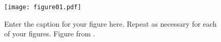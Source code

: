 \documentclass{ametsocV5}
\begin{document}
%

%
\begin{figure}[t]
 \noindent\texttt{[image: figure01.pdf]}\\
 \caption{Enter the caption for your figure here.  Repeat as
 necessary for each of your figures. Figure from \protect\cite{Knutti2008}.}\label{f1}
\end{figure}
\end{document}
